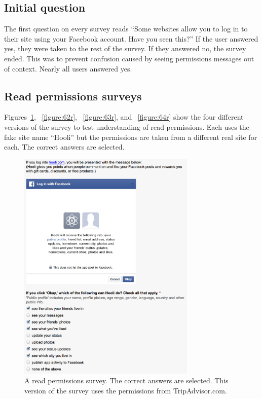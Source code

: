 \documentclass{sig-alternate}
\begin{document}
{\subsection{Initial question}

The first question on every survey reads ``Some websites allow you to log in to their site using your Facebook account. Have you seen this?'' If the user answered yes, they were taken to the rest of the survey. If they answered no, the survey ended. This was to prevent confusion caused by seeing permissions messages out of context. Nearly all users answered yes.

\subsection{Read permissions surveys}
\label{appendix:readsurveys}

Figures~\ref{figure:61r}, ~\ref{figure:62r}, ~\ref{figure:63r}, and ~\ref{figure:64r} show the four different versions of the survey to test understanding of read permissions. Each uses the fake site name ``Hooli'' but the permissions are taken from a different real site for each. The correct answers are selected.

\begin{figure}[h!]
  \centering
  \includegraphics[width=8.5cm]{61r}
  \caption{A read permissions survey. The correct answers are selected. This version of the survey uses the permissions from TripAdvisor.com.}
  \label{figure:61r}
\end{figure}

}
\end{document}
